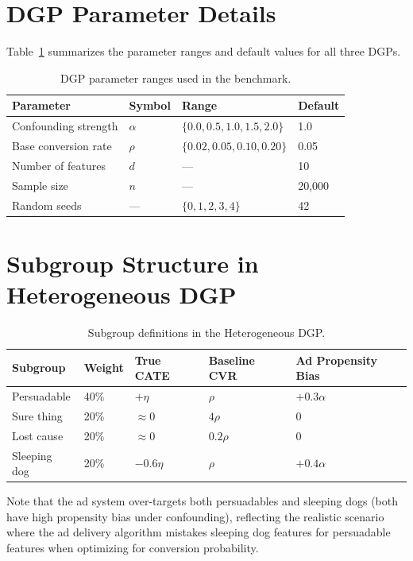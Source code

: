 \documentclass[10pt]{article}
\begin{document}
\appendix
\section{DGP Parameter Details}
\label{app:dgp_params}

Table~\ref{tab:dgp_params} summarizes the parameter ranges and default values
for all three DGPs.

\begin{table}[H]
\centering
\caption{DGP parameter ranges used in the benchmark.}
\label{tab:dgp_params}
\begin{tabular}{llll}
\toprule
Parameter & Symbol & Range & Default \\
\midrule
Confounding strength & $\alpha$ & $\{0.0, 0.5, 1.0, 1.5, 2.0\}$ & 1.0 \\
Base conversion rate & $\rho$ & $\{0.02, 0.05, 0.10, 0.20\}$ & 0.05 \\
Number of features & $d$ & --- & 10 \\
Sample size & $n$ & --- & 20{,}000 \\
Random seeds & --- & $\{0, 1, 2, 3, 4\}$ & 42 \\
\bottomrule
\end{tabular}
\end{table}

\section{Subgroup Structure in Heterogeneous DGP}
\label{app:subgroups}

\begin{table}[H]
\centering
\caption{Subgroup definitions in the Heterogeneous DGP.}
\label{tab:subgroups}
\begin{tabular}{lllll}
\toprule
Subgroup & Weight & True CATE & Baseline CVR & Ad Propensity Bias \\
\midrule
Persuadable  & 40\% & $+\eta$ & $\rho$      & $+0.3\alpha$ \\
Sure thing   & 20\% & $\approx 0$ & $4\rho$ & $0$ \\
Lost cause   & 20\% & $\approx 0$ & $0.2\rho$ & $0$ \\
Sleeping dog & 20\% & $-0.6\eta$ & $\rho$   & $+0.4\alpha$ \\
\bottomrule
\end{tabular}
\end{table}

Note that the ad system over-targets both persuadables and sleeping dogs
(both have high propensity bias under confounding), reflecting the realistic
scenario where the ad delivery algorithm mistakes sleeping dog features for
persuadable features when optimizing for conversion probability.
\end{document}
